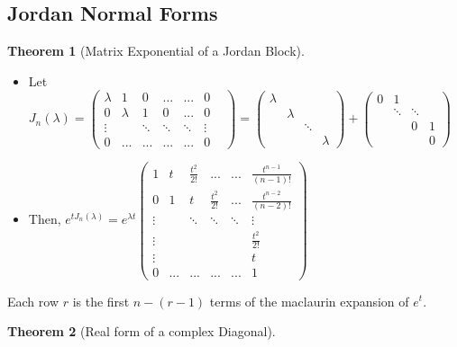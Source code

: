 \documentclass{article}
\newtheorem{thm}{Theorem}[section]
\begin{document}
\subsection{Jordan Normal Forms}
\begin{thm}[Matrix Exponential of a Jordan Block]
\end{thm}
\begin{itemize}
    \item Let $J_n(\lambda) = \begin{pmatrix}
    \lambda & 1 &0 &...&...&0 \\
    0 & \lambda & 1 & 0 & ... &0 \\
    \vdots & & \ddots & \ddots &\ddots & \vdots&\\
    0 &...&...&...&...& 0
\end{pmatrix} = \begin{pmatrix}
    \lambda &&& \\
    &\lambda&&\\
    &&\ddots&\\
    &&&\lambda
\end{pmatrix} + \begin{pmatrix}
    0&1&&\\
    &\ddots&\ddots&\\
    &&0&1\\
    &&&0
    
\end{pmatrix}$

\item Then, $e^{tJ_n(\lambda)} = e^{\lambda t} \begin{pmatrix}
    1 & t & \frac{t^2}{2!} &...&...& \frac{t^{n-1}}{(n-1)!}\\
    0 & 1 & t & \frac{t^2}{2!} & ... &\frac{t^{n-2}}{(n-2)!} \\
    \vdots & & \ddots & \ddots &\ddots & \vdots\\
    \vdots&&&&&\frac{t^2}{2!}\\
    \vdots&&&&&t\\
    0 &...&...&...&...& 1
\end{pmatrix}$
\end{itemize}
Each row $r$ is the first $n-(r - 1)$ terms of the maclaurin expansion of $e^{t}$.
\begin{thm}[Real form of a complex Diagonal]    
\end{thm}
\end{document}
